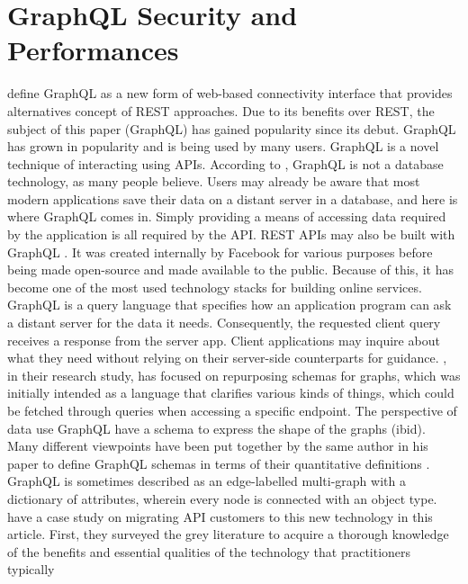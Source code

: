\section{GraphQL Security and Performances}
\label{s:GraphQLSecurity}
\citet{hartigInitialAnalysisFacebook2017} define GraphQL as a new form of
web-based connectivity interface that provides alternatives concept of
REST approaches. Due to its benefits over REST, the subject of this paper (GraphQL) has gained
popularity since its debut. GraphQL has grown in popularity and is being used by
many users. GraphQL is a novel technique of interacting using APIs. According to
\citet{vogelExperiencesMigratingRESTful2018}, GraphQL is not a database
technology, as many people believe. Users may already be aware that most modern
applications save their data on a distant server in a database, and here is
where GraphQL comes in. Simply providing a means of accessing data required by
the application is all required by the API. REST APIs may also be built with
GraphQL \citep{vadlamaniCanGraphQLReplace2021}. It was created internally by
Facebook for various purposes before being made open-source and made available
to the public. Because of this, it has become one of the most used technology
stacks for building online services. GraphQL is a query language that specifies
how an application program can ask a distant server for the data it needs.
Consequently, the requested client query receives a response from the server app.
Client applications may inquire about what they need without relying on their
server-side counterparts for guidance. \citet{
hartigDefiningSchemasProperty2019}, in their research study, has focused on
repurposing schemas for graphs, which was initially intended as a language that
clarifies various kinds of things, which could be fetched through queries when
accessing a specific endpoint. The perspective of data use GraphQL have a schema
to express the shape of the graphs (ibid). Many different viewpoints have been
put together by the same author in his paper to define GraphQL schemas in terms
of their quantitative definitions
\citep{hartigInitialAnalysisFacebook2017}. GraphQL is sometimes described as an
edge-labelled multi-graph with a dictionary of attributes, wherein every node is
connected with an object type. \citet{britoMigratingGraphQLPractical2019} have a
case study on migrating API customers to this new technology in this article.
First, they surveyed the grey literature to acquire a thorough knowledge of the
benefits and essential qualities of the technology that practitioners typically
